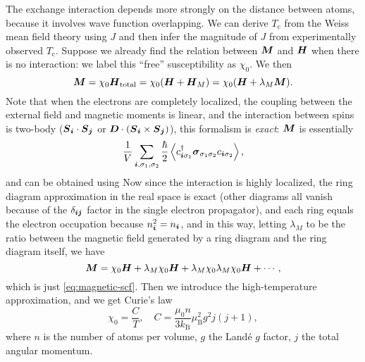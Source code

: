 \documentclass[hyperref, a4paper]{article}
\newcommand*{\Tc}{T_{\text{c}}}
\newcommand*{\muB}{\mu_{\text{B}}}
\newcommand*{\kB}{k_{\text{B}}}
\begin{document}
The exchange interaction depends more strongly on 
the distance between atoms, 
because it involves wave function overlapping.
We can derive $\Tc$ from the Weiss mean field theory using $J$ 
and then infer the magnitude of $J$ from experimentally observed $\Tc$.
Suppose we already find the relation between $\vb*{M}$ and $\vb*{H}$ when there is no interaction:
we label this ``free'' susceptibility as $\chi_0$.
We then 
\begin{equation}
    \vb*{M} = \chi_0 \vb*{H}_{\text{total}} = \chi_0 (\vb*{H} + \vb*{H}_M) 
    = \chi_0 (\vb*{H} + \lambda_M \vb*{M}).
    \label{eq:magnetic-scf}
\end{equation}
Note that when the electrons are completely localized,
the coupling between the external field and magnetic moments is linear,
and the interaction between spins 
is two-body ($\vb*{S}_{\vb*{i}} \cdot \vb*{S}_{\vb*{j}}$ 
or $\vb*{D} \cdot (\vb*{S}_{\vb*{i}} \times \vb*{S}_{\vb*{j}})$),
this formalism is \emph{exact}:
$\vb*{M}$ is essentially 
\[
    \frac{1}{V} \sum_{\vb*{i}, \sigma_1, \sigma_2} \frac{\hbar}{2} 
    \expval{
        c^\dagger_{\vb*{i} \sigma_1} 
        \vb*{\sigma}_{\sigma_1 \sigma_2}
        c_{\vb*{i} \sigma_2}
    },
\]
and can be obtained using 
Now since the interaction is highly localized,
the ring diagram approximation in the real space is exact
(other diagrams all vanish because of the $\delta_{\vb*{i} \vb*{j}}$ factor 
in the single electron propagator),
and each ring equals the electron occupation because $n_{\vb*{i}}^2 = n_{\vb*{i}}$,
and in this way,
letting $\lambda_M$ to be 
the ratio between the magnetic field generated by a ring diagram 
and the ring diagram itself,
we have
\[
    \vb*{M} = \chi_0 \vb*{H} + \lambda_M \chi_0 \vb*{H} + \lambda_M \chi_0 \lambda_M \chi_0 \vb*{H} + \cdots,
\]
which is just \eqref{eq:magnetic-scf}. 
Then we introduce the high-temperature approximation, 
and we get Curie's law
\begin{equation}
    \chi_0 = \frac{C}{T}, \quad C = \frac{\mu_0 n}{3 \kB} \muB^2 g^2 j(j+1),
    \label{eq:curie}
\end{equation}
where $n$ is the number of atoms per volume,
$g$ the Landé $g$ factor, 
$j$ the total angular momentum.
\end{document}
